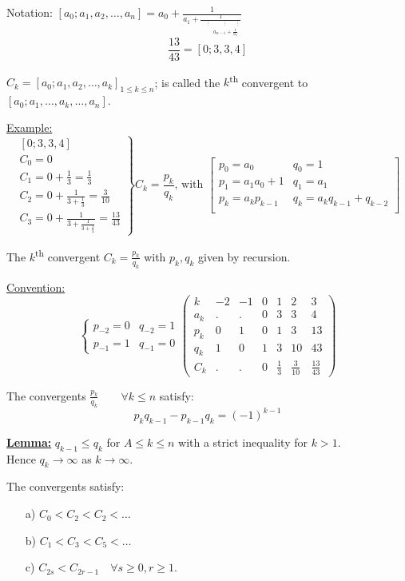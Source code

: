 \documentclass{report}
\newcommand{\up}[1]{\textsuperscript{#1}}
\begin{document}
Notation: $[a_0;a_1,a_2,\dots,a_n]=a_0+\frac{1}{a_1+\frac{1}{\begin{array}{lcl}
		&\scriptstyle{\vdots}& \qquad \scriptstyle{\vdots \qquad \vdots}\\
		&&\scriptstyle{a_{n-1}+\frac{1}{a_n}}
		\end{array}}}$
\[\frac{13}{43}=[0;3,3,4]\]
\begin{defi} $C_k=[a_0;a_1,a_2,\dots,a_k]_{1\leq k\leq n}$;  is called the $k$\up{th} convergent to $[a_0;a_1,\dots,a_k,\dots,a_n]$.
\end{defi}
\underline{Example:} \[	\left.
\begin{array}{lcl}
[0;3,3,4]\\
C_0=0\\
C_1=0+\frac{1}{3}=\frac{1}{3}\\
C_2=0+\frac{1}{3+\frac{1}{3}}=\frac{3}{10}\\
C_3=0+\frac{1}{3+\frac{1}{3+\frac{1}{4}}}=\frac{13}{43}
\end{array}
\right \} C_k=\frac{p_k}{q_k}\text{, with  }
\left [
\begin{array}{lll}
p_0=a_0&q_0=1\\
p_1=a_1a_0+1&q_1=a_1\\
p_k=a_kp_{k-1}&q_k=a_kq_{k-1}+q_{k-2}\\
\end{array}
\right ]
\]
\begin{thm} The $k$\up{th} convergent $C_k=\frac{p_k}{q_k}$ with $p_k, q_k$ given by recursion.
\end{thm}
\underline{Convention:}
\[\left \{
\begin{array}{lcl}
p_{-2}=0&q_{-2}=1\\
p_{-1}=1&q_{-1}=0
\end{array}
\right.
\left(
\begin{array}{l|l|l|l|l|l|l}
k&-2&-1&0&1&2&3\\ \hline
a_k&.&.&0&3&3&4\\
p_k&0&1&0&1&3&13\\
q_k&1&0&1&3&10&43\\
C_k&.&.&0&\frac{1}{3}&\frac{3}{10}&\frac{13}{43}
\end{array}
\right)
\]
\begin{thm}The convergents $\frac{p_k}{q_k}\qquad \scriptstyle{\forall k\leq n}$ satisfy:\[p_kq_{k-1}-p_{k-1}q_k=(-1)^{k-1}\]
\end{thm}
\underline{\textbf{Lemma:}}  $q_{k-1}\leq q_k$ for $A\leq k \leq n$ with a strict inequality for $k>1$.\\
Hence $q_k\longrightarrow \infty$ as $k\longrightarrow \infty$.
\begin{thm} The convergents satisfy:
	\begin{itemize}
		\item[a)] $C_0<C_2<C_2<\dots$
		\item[b)] $C_1<C_3<C_5<\dots$
		\item[c)] $C_{2s}<C_{2r-1} \quad \forall s\geq 0, r\geq 1.$
	\end{itemize}
\end{thm}
\end{document}
